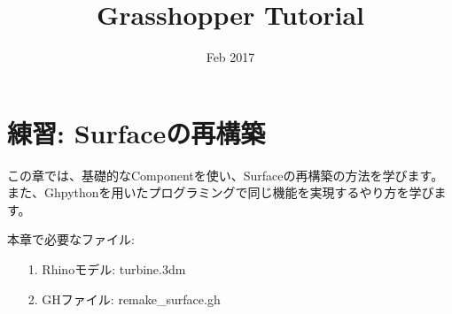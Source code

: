 \documentclass[11pt]{jarticle}
\title{Grasshopper Tutorial}
\date{Feb 2017}
\begin{document}
\maketitle
%
\section{練習: Surfaceの再構築}
この章では、基礎的なComponentを使い、Surfaceの再構築の方法を学びます。
また、Ghpythonを用いたプログラミングで同じ機能を実現するやり方を学びます。

\noindent 本章で必要なファイル: 
\begin{itemize}
\item
[1. ]Rhinoモデル: turbine.3dm
\item
[2. ]GHファイル: remake\_surface.gh
\end{itemize}
\end{document}
